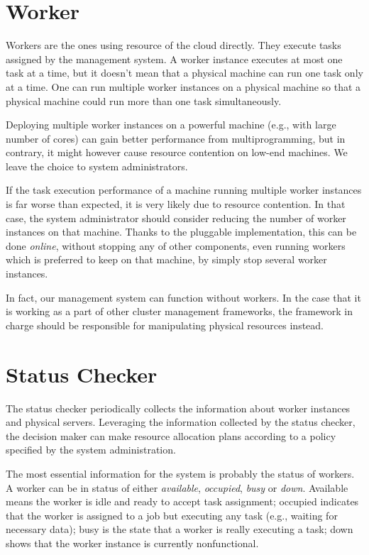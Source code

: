 \section{Worker}

Workers are the ones using resource of the cloud directly.
They execute tasks assigned by the management system.
A worker instance executes at most one task at a time, but it doesn't
mean that a physical machine can run one task only at a time.
One can run multiple worker instances on a physical machine so that a
physical machine could run more than one task simultaneously.	 

Deploying multiple worker instances on a powerful machine (e.g., with
large number of cores) can gain better performance from
multiprogramming, but in contrary, it might however cause resource
contention on low-end machines.
We leave the choice to system administrators.


If the task execution performance of a machine running multiple worker
instances is far worse than expected, it is very likely due to resource
contention.
In that case, the system administrator should consider reducing the
number of worker instances on that machine.
Thanks to the pluggable implementation, this can be done \emph{online},
without stopping any of other components, even running workers which is
preferred to keep on that machine, by simply stop several worker
instances.

In fact, our management system can function without workers.
In the case that it is working as a part of other cluster management
frameworks, the framework in charge should be responsible for
manipulating physical resources instead.

\section{Status Checker}

The status checker periodically collects the information about worker
instances and physical servers.
Leveraging the information collected by the status checker, the decision
maker can make resource allocation plans according to a policy specified
by the system administration.

The most essential information for the system is probably the status of
workers.
A worker can be in status of either \emph{available}, \emph{occupied},
\emph{busy} or \emph{down}.
Available means the worker
is idle and ready to accept task assignment; occupied indicates that the
worker is assigned to a job but executing any task (e.g., waiting for
necessary data); busy is the state that a worker is really executing a
task; down shows that the worker instance is currently nonfunctional. 

